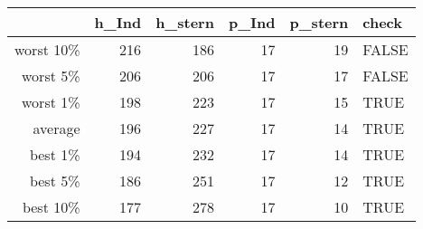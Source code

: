 \begin{tabular}{rrrrrl}
  \toprule
 & h\_Ind & h\_stern & p\_Ind & p\_stern & check \\ 
  \midrule
worst 10\% & 216 & 186 & 17 & 19 & FALSE \\ 
  worst 5\% & 206 & 206 & 17 & 17 & FALSE \\ 
  worst 1\% & 198 & 223 & 17 & 15 & TRUE \\ 
  average & 196 & 227 & 17 & 14 & TRUE \\ 
  best 1\% & 194 & 232 & 17 & 14 & TRUE \\ 
  best 5\% & 186 & 251 & 17 & 12 & TRUE \\ 
  best 10\% & 177 & 278 & 17 & 10 & TRUE \\ 
   \bottomrule
\end{tabular}
